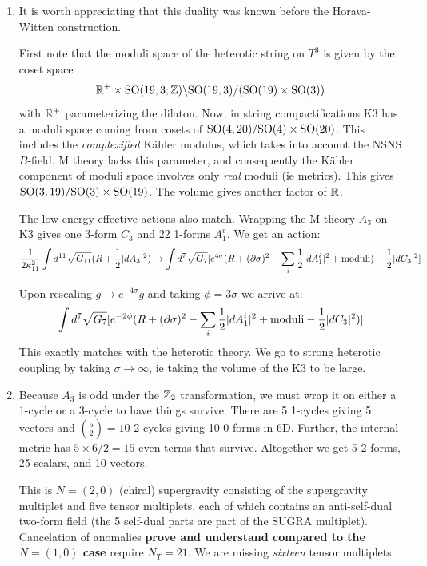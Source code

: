 \documentclass[11pt, class=article, crop=false]{standalone}
\begin{document}
\begin{enumerate}
	\item It is worth appreciating that this duality was known before the Horava-Witten construction.
	
	First note that the moduli space of the heterotic string on $T^3$ is given by the coset space 
	\[
		\mathbb{R}^+ \times \mathrm{SO}(19,3;\mathbb{Z})\backslash \mathrm{SO}(19,3)/(\mathrm{SO}(19) \times \mathrm{SO}(3))
	\]
	with $\mathbb{R}^+$ parameterizing the dilaton. Now, in string compactifications K3 has a moduli space coming from cosets of $\mathrm{SO}(4, 20)/\mathrm{SO}(4) \times \mathrm{SO}(20)$. This includes the \emph{complexified} K\"ahler modulus, which takes into account the NSNS $B$-field. M theory lacks this parameter, and consequently the K\"ahler component of moduli space involves only \emph{real} moduli (ie metrics). This gives $\mathrm{SO}(3, 19)/\mathrm{SO}(3) \times \mathrm{SO}(19)$. The volume gives another factor of $\mathbb{R}$.
	
	The low-energy effective actions also match. Wrapping the M-theory $A_3$ on K3 gives one 3-form $C_3$ and 22 1-forms $A_1^i$. We get an action:
	\[
		\frac{1}{2 \kappa_{11}^2}\int d^{11} \sqrt{G_{11}} (R + \frac12 |dA_3|^2)  \to \int   d^{7} \sqrt{G_{7}} [e^{4 \sigma} (R + (\partial \sigma)^2 - \sum_i \frac12 |dA_1^i|^2  + \text{moduli} ) - \frac12 |dC_3|^2]
	\]
	
	Upon rescaling $g \to e^{-4\sigma} g$ and taking $\phi = 3 \sigma$ we arrive at:
	\[
		\int   d^{7} \sqrt{G_{7}} [e^{-2 \phi} (R + (\partial \sigma)^2 - \sum_i \frac12 |dA_1^i|^2  + \text{moduli} - \frac12 |dC_3|^2) ]
	\]
	This exactly matches with the heterotic theory. We go to strong heterotic coupling by taking $\sigma \to \infty$, ie taking the volume of the K3 to be large. 
	
	
	\item
	 Because $A_3$ is odd under the $\mathbb{Z}_2$ transformation, we must wrap it on either a 1-cycle or a 3-cycle to have things survive. There are 5 1-cycles giving 5 vectors and ${5 \choose 2} = 10$ 2-cycles giving 10 $0$-forms in 6D. Further, the internal metric has $5 \times 6/2 = 15$ even terms that survive. Altogether we get 5 2-forms, 25 scalars, and 10 vectors. 
	
	This is $N=(2,0)$ (chiral) supergravity consisting of the supergravity multiplet and five tensor multiplets, each of which contains an anti-self-dual two-form field (the 5 self-dual parts are part of the SUGRA multiplet). Cancelation of anomalies \textbf{prove and understand compared to the $N = (1,0)$ case} require $N_T = 21$. We are missing \emph{sixteen} tensor multiplets.  
	

\end{enumerate}
\end{document}
